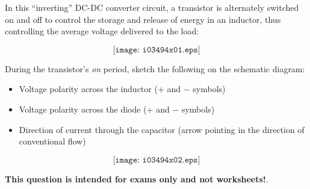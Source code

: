 

In this ``inverting'' DC-DC converter circuit, a transistor is alternately switched on and off to control the storage and release of energy in an inductor, thus controlling the average voltage delivered to the load: 

$$\texttt{[image: i03494x01.eps]}$$

During the transistor's {\it on} period, sketch the following on the schematic diagram:

\begin{itemize}
\item{} Voltage polarity across the inductor (+ and $-$ symbols)
\vskip 5pt
\item{} Voltage polarity across the diode (+ and $-$ symbols)
\vskip 5pt
\item{} Direction of current through the capacitor (arrow pointing in the direction of conventional flow)
\end{itemize}







$$\texttt{[image: i03494x02.eps]}$$







{\bf This question is intended for exams only and not worksheets!}.



